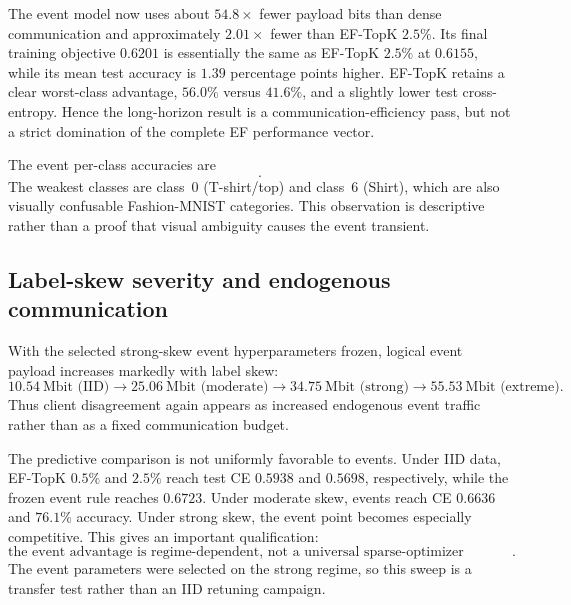 The event model now uses about $54.8\times$ fewer payload bits than dense communication and approximately $2.01\times$ fewer than EF-TopK $2.5\%$. Its final training objective $0.6201$ is essentially the same as EF-TopK $2.5\%$ at $0.6155$, while its mean test accuracy is $1.39$ percentage points higher. EF-TopK retains a clear worst-class advantage, $56.0\%$ versus $41.6\%$, and a slightly lower test cross-entropy. Hence the long-horizon result is a communication-efficiency pass, but not a strict domination of the complete EF performance vector.

The event per-class accuracies are
\begin{equation}
[0.416,0.898,0.795,0.877,0.720,0.835,0.557,0.836,0.941,0.949].
\end{equation}
The weakest classes are class~0 (T-shirt/top) and class~6 (Shirt), which are also visually confusable Fashion-MNIST categories. This observation is descriptive rather than a proof that visual ambiguity causes the event transient.

\subsection{Label-skew severity and endogenous communication}

With the selected strong-skew event hyperparameters frozen, logical event payload increases markedly with label skew:
\begin{equation}
10.54\ \text{Mbit (IID)}
\rightarrow
25.06\ \text{Mbit (moderate)}
\rightarrow
34.75\ \text{Mbit (strong)}
\rightarrow
55.53\ \text{Mbit (extreme)}.
\end{equation}
Thus client disagreement again appears as increased endogenous event traffic rather than as a fixed communication budget.

The predictive comparison is not uniformly favorable to events. Under IID data, EF-TopK $0.5\%$ and $2.5\%$ reach test CE $0.5938$ and $0.5698$, respectively, while the frozen event rule reaches $0.6723$. Under moderate skew, events reach CE $0.6636$ and $76.1\%$ accuracy. Under strong skew, the event point becomes especially competitive. This gives an important qualification:
\begin{equation}
\boxed{\text{the event advantage is regime-dependent, not a universal sparse-optimizer dominance}.}
\end{equation}
The event parameters were selected on the strong regime, so this sweep is a transfer test rather than an IID retuning campaign.

